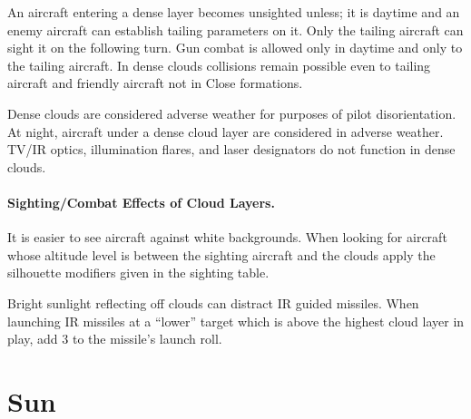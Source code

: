 \begin{advancedrules}
{An aircraft entering a dense layer becomes unsighted unless; it is daytime and an enemy aircraft can establish tailing parameters on it. Only the tailing aircraft can sight it on the following turn. Gun combat is allowed only in daytime and only to the tailing aircraft. In dense clouds collisions remain possible even to tailing aircraft and friendly aircraft not in Close formations.

Dense clouds are considered adverse weather for purposes of pilot disorientation. At night, aircraft under a dense cloud layer are considered in adverse weather. TV/IR optics, illumination flares, and laser designators do not function in dense clouds.

\paragraph{Sighting/Combat Effects of Cloud Layers.} It is easier to see aircraft against white backgrounds. When looking for aircraft whose altitude level is between the sighting aircraft and the clouds apply the silhouette modifiers given in the sighting table.

Bright sunlight reflecting off clouds can distract IR guided missiles. When launching IR missiles at a “lower” target which is above the highest cloud layer in play, add 3 to the missile's launch roll.
}


\section{Sun}
\label{rule:sun}

\end{advancedrules}
